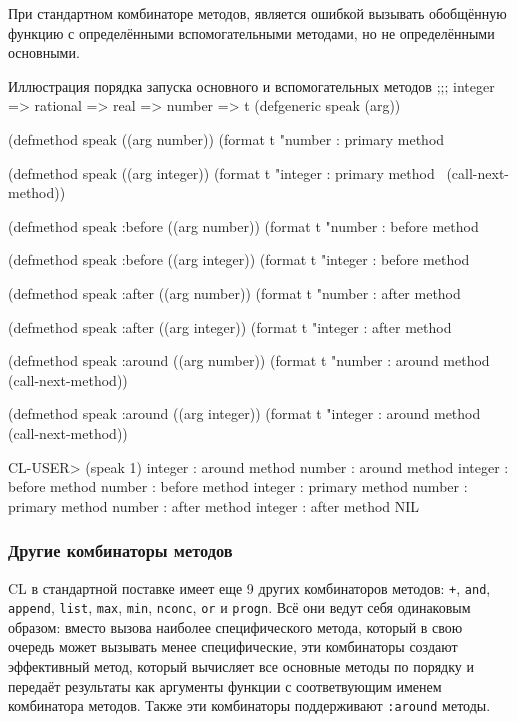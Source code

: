 При стандартном комбинаторе методов, является ошибкой вызывать обобщённую функцию с определёнными вспомогательными методами, но не определёнными основными.

\begin{cllst}{Иллюстрация порядка запуска основного и вспомогательных методов}{}
;;; integer => rational => real => number => t
(defgeneric speak (arg))

(defmethod speak ((arg number))
  (format t "number  : primary method~%

(defmethod speak ((arg integer))
  (format t "integer : primary method~%
  (call-next-method))

(defmethod speak :before ((arg number))
  (format t "number  : before method~%

(defmethod speak :before ((arg integer))
  (format t "integer : before method~%

(defmethod speak :after ((arg number))
  (format t "number  : after method~%

(defmethod speak :after ((arg integer))
  (format t "integer : after method~%

(defmethod speak :around ((arg number))
  (format t "number  : around method~%
  (call-next-method))

(defmethod speak :around ((arg integer))
  (format t "integer : around method~%
  (call-next-method))

CL-USER> (speak 1)
integer : around method
number  : around method
integer : before method
number  : before method
integer : primary method
number  : primary method
number  : after method
integer : after method
NIL
\end{cllst}

\subsubsection{Другие комбинаторы методов}
CL в стандартной поставке имеет еще 9 других комбинаторов методов: \lstinline{+}, \lstinline{and}, \lstinline{append}, \lstinline{list}, \lstinline{max}, \lstinline{min}, \lstinline{nconc}, \lstinline{or} и \lstinline{progn}. Всё они ведут себя одинаковым образом: вместо вызова наиболее специфического метода, который в свою очередь может вызывать менее специфические, эти комбинаторы создают эффективный метод, который вычисляет все основные методы по порядку и передаёт результаты как аргументы функции с соответвующим именем комбинатора методов. Также эти комбинаторы поддерживают \lstinline{:around} методы.

